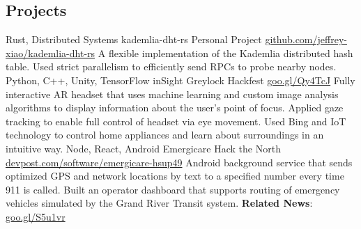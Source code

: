 \documentclass{resume}
\begin{document}
\begin{main}
    \section{Projects}
      \begin{entrylist}
        \rightentry%
          {Rust, Distributed Systems}%
          {kademlia-dht-rs}%
          {Personal Project}%
          {\href{https://github.com/jeffrey-xiao/kademlia-dht-rs}{github.com/jeffrey-xiao/kademlia-dht-rs}}%
          {\createlist%
            {%
              A flexible implementation of the Kademlia distributed hash table. %
            }%
            {%
              Used strict parallelism to efficiently send RPCs to probe nearby nodes. %
            }%
          }
        \rightentry%
          {Python, C++, Unity, TensorFlow}%
          {inSight}%
          {Greylock Hackfest}%
          {\href{https://goo.gl/Qy4TcJ}{goo.gl/Qy4TcJ}}%
          {\createlist%
            {%
              Fully interactive AR headset that uses machine learning and custom image %
              analysis algorithms to display information about the user's point of focus. %
            }%
            {%
              Applied gaze tracking to enable full control of headset via eye movement. %
            }%
            {%
              Used Bing and IoT technology to control home appliances and learn about surroundings %
              in an intuitive way. %
            }%
          }
        \rightentry%
          {Node, React, Android}%
          {Emergicare}%
          {Hack the North}%
          {\href{https://devpost.com/software/emergicare-hsup49}{devpost.com/software/emergicare-hsup49}}%
          {\createlist%
            {%
              Android background service that sends optimized GPS and network locations by text to %
              a specified number every time 911 is called. %
            }%
            {%
              Built an operator dashboard that supports routing of emergency vehicles simulated by %
              the Grand River Transit system. %
            }%
            {%
              \textbf{Related News}: \color{lightred}\href{https://goo.gl/S5u1vr}{goo.gl/S5u1vr}%
            }%
          }
      \end{entrylist}
  \end{main}
\end{document}
